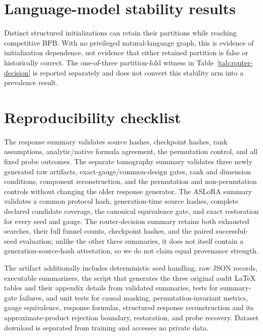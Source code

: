 \section{Language-model stability results}
\label{app:language-results}


Distinct structured initializations can retain their partitions while reaching
competitive BPB.  With no privileged natural-language graph, this is evidence
of initialization dependence, not evidence that either retained partition is
false or historically correct.  The one-of-three partition-fold witness in
Table~\ref{tab:router-decision} is reported separately and does not convert this
stability arm into a prevalence result.

\section{Reproducibility checklist}

The response summary validates source hashes, checkpoint hashes, rank
assumptions, analytic/native formula agreement, the permutation control, and
all fixed probe outcomes.  The separate tomography summary validates three
newly generated raw artifacts, exact-gauge/common-design gates, rank and
dimension conditions, component reconstruction, and the permutation and
non-permutation controls without changing the older response generator.  The ASLoRA summary validates a common protocol hash,
generation-time source hashes, complete declared candidate coverage, the
canonical equivalence gate, and exact restoration for every seed and gauge.
The router-decision summary retains both exhausted searches, their full funnel
counts, checkpoint hashes, and the paired successful-seed evaluation; unlike
the other three summaries, it does not itself contain a generation-source-hash
attestation, so we do not claim equal provenance strength.

The artifact additionally includes deterministic seed handling, raw JSON
records, executable summarizers, the script that generates the three original audit
LaTeX tables and their appendix details from validated summaries, tests for summary-gate failures,
and unit tests for causal masking, permutation-invariant metrics, gauge
equivalence, response formulas, structured response reconstruction and its
approximate-product rejection boundary, restoration, and probe recovery.  Dataset
download is separated from training and accesses no private data.
